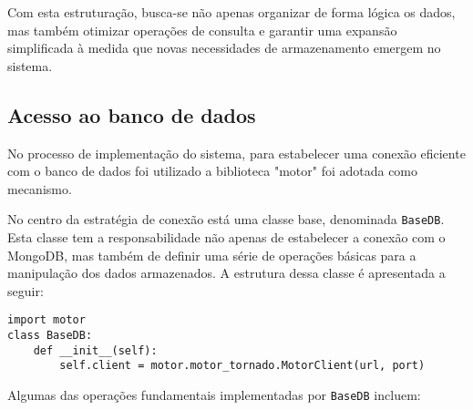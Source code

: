 Com esta estruturação, busca-se não apenas organizar de forma lógica os dados, mas também otimizar operações de consulta e garantir uma expansão simplificada à medida que novas necessidades de armazenamento emergem no sistema.


\subsection[Acesso ao banco de dados]{Acesso ao banco de dados}

No processo de implementação do sistema, para estabelecer uma conexão eficiente com o banco de dados foi utilizado a biblioteca "motor" foi adotada como mecanismo.

No centro da estratégia de conexão está uma classe base, denominada \texttt{BaseDB}. Esta classe tem a responsabilidade não apenas de estabelecer a conexão com o MongoDB, mas também de definir uma série de operações básicas para a manipulação dos dados armazenados. A estrutura dessa classe é apresentada a seguir:

\begin{verbatim}
import motor
class BaseDB:
    def __init__(self):
        self.client = motor.motor_tornado.MotorClient(url, port)
\end{verbatim}

Algumas das operações fundamentais implementadas por \texttt{BaseDB} incluem:

